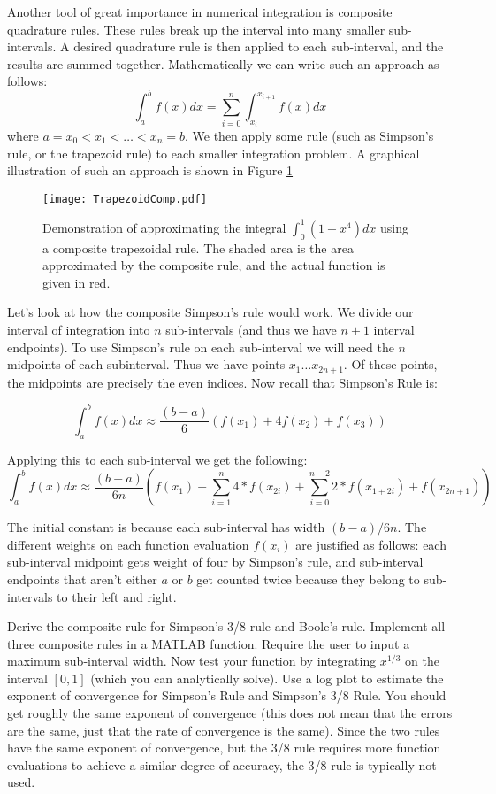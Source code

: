 Another tool of great importance in numerical integration is composite quadrature rules. These rules break up the interval into many smaller sub-intervals. A desired quadrature rule is then applied to each sub-interval, and the results are summed together. Mathematically we can write such an approach as follows:
\[
\int_a^b f(x) dx = \sum_{i=0}^n \int_{x_i}^{x_{i+1}} f(x) dx
\]
where $a = x_0 < x_1 < \ldots < x_n = b$. We then apply some rule (such as Simpson's rule, or the trapezoid rule) to each smaller integration problem. A graphical illustration of such an approach is shown in Figure \ref{Fig:TrapezoidalComposite}

\begin{figure}
\begin{center}
\texttt{[image: TrapezoidComp.pdf]}
\caption{Demonstration of approximating the integral $\int_0^1 (1-x^4)dx$ using a composite trapezoidal rule. The shaded area is the area approximated by the composite rule, and the actual function is given in red.}
\label{Fig:TrapezoidalComposite}
\end{center}
\end{figure}

Let's look at how the composite Simpson's rule would work. We divide our interval of integration into $n$ sub-intervals (and thus we have $n+1$ interval endpoints). To use Simpson's rule on each sub-interval we will need the $n$ midpoints of each subinterval. Thus we have points $x_1 \ldots x_{2n+1}$. Of these points, the midpoints are precisely the even indices. Now recall that Simpson's Rule is:

\[
\int_a^b f(x) dx \approx \frac{(b-a)}{6}\left(f(x_1) + 4 f(x_2) + f(x_3)\right)
\]

Applying this to each sub-interval we get the following:
\[
\int_a^b f(x) dx \approx \frac{(b-a)}{6n}\left( f(x_1) + \sum_{i=1}^{n} 4*f(x_{2i}) + \sum_{i=0}^{n-2} 2*f(x_{1+2i}) + f(x_{2n+1})\right)
\]

The initial constant is because each sub-interval has width $(b-a)/6n$. The different weights on each function evaluation $f(x_i)$ are justified as follows: each sub-interval midpoint gets weight of four by Simpson's rule, and sub-interval endpoints that aren't either $a$ or $b$ get counted twice because they belong to sub-intervals to their left and right.

\begin{problem}
Derive the composite rule for Simpson's 3/8 rule and Boole's rule. Implement all three composite rules in a MATLAB function. Require the user to input a maximum sub-interval width. Now test your function by integrating $x^{1/3}$ on the interval $[0,1]$ (which you can analytically solve). Use a log plot to estimate the exponent of convergence for Simpson's Rule and Simpson's 3/8 Rule. You should get roughly the same exponent of convergence (this does not mean that the errors are the same, just that the rate of convergence is the same). Since the two rules have the same exponent of convergence, but the 3/8 rule requires more function evaluations to achieve a similar degree of accuracy, the 3/8 rule is typically not used.
\end{problem}

